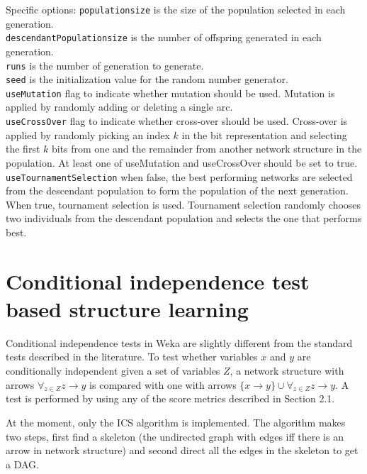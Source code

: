 \documentclass{article}
\begin{document}
\begin{itemize}
Specific options:
{\tt populationsize} is the size of the population selected in each generation.\\
{\tt descendantPopulationsize} is the number of offspring generated in each generation.\\
{\tt runs} is the number of generation to generate.\\
{\tt seed} is the initialization value for the random number generator.\\
{\tt useMutation} flag to indicate whether mutation should be used. Mutation is applied by
randomly adding or deleting a single arc.\\
{\tt useCrossOver} flag to indicate whether cross-over should be used. Cross-over is applied
by randomly picking an index $k$ in the bit representation and selecting the first $k$ bits
from one and the remainder from another network structure in the population.
At least one of useMutation and useCrossOver should be set to true.\\
{\tt useTournamentSelection} when false, the best performing networks are selected from
the descendant population to form the population of the next generation. 
When true, tournament selection is used. Tournament selection randomly chooses two
individuals from the descendant population and selects the one that performs best.\\
\end{itemize}

\section{Conditional independence test based structure learning}

Conditional independence tests in Weka are slightly different from the
standard tests described in the literature. To test whether variables
$x$ and $y$ are conditionally independent given a set of variables $Z$,
a network structure with arrows $\forall_{z\in Z}z \to y$ is compared with
one with arrows $\{x\to y\} \cup \forall_{z\in Z}z \to y$. 
A test is performed by using any of the score metrics described in Section 
2.1.

\begin{center}
\end{center}

At the moment, only the ICS algorithm \cite{verma} is implemented. The algorithm
makes two steps, first find a skeleton (the undirected graph with edges iff there
is an arrow in network structure) and second direct all the edges in the skeleton
to get a DAG.
\end{document}
